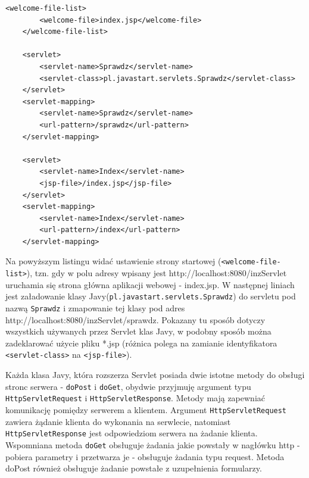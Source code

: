 \documentclass[eng,printmode,oneside]{mgr}
\begin{document}
\lstset{language=XML,firstnumber=1,stepnumber=1}
\begin{lstlisting}[caption=Fragment pliku web.xml,label=webxml]
	<welcome-file-list>
		<welcome-file>index.jsp</welcome-file>
	</welcome-file-list>

	<servlet>
		<servlet-name>Sprawdz</servlet-name>
		<servlet-class>pl.javastart.servlets.Sprawdz</servlet-class>
	</servlet>
	<servlet-mapping>
		<servlet-name>Sprawdz</servlet-name>
		<url-pattern>/sprawdz</url-pattern>
	</servlet-mapping>
	
	<servlet>
		<servlet-name>Index</servlet-name>
		<jsp-file>/index.jsp</jsp-file>
	</servlet>
	<servlet-mapping>
		<servlet-name>Index</servlet-name>
		<url-pattern>/index</url-pattern>
	</servlet-mapping>
\end{lstlisting}

Na powyższym listingu widać ustawienie strony startowej
(\texttt{<welcome-file-list>}), tzn. gdy w polu adresy wpisany jest
http://localhost:8080/inzServlet uruchamia się strona główna aplikacji webowej -
index.jsp. W następnej liniach jest załadowanie klasy
Javy(\texttt{pl.javastart.servlets.Sprawdz}) do servletu pod nazwą
\texttt{Sprawdz} i zmapowanie tej klasy pod adres
http://localhost:8080/inzServlet/sprawdz. Pokazany tu sposób dotyczy wszystkich
używanych przez Servlet klas Javy, w podobny sposób można zadeklarować użycie
pliku *.jsp (różnica polega na zamianie identyfikatora \texttt{<servlet-class>}
na \texttt{<jsp-file>}). 

Każda klasa Javy, która rozszerza Servlet posiada dwie istotne metody do obsługi
stronc serwera - \texttt{doPost} i \texttt{doGet}, obydwie przyjmuję argument
typu \texttt{HttpServletRequest} i \texttt{HttpServletResponse}.
Metody mają zapewniać komunikację pomiędzy serwerem a klientem. Argument
\texttt{HttpServletRequest} zawiera żądanie klienta do wykonania na serwlecie,
natomiast \texttt{HttpServletResponse} jest odpowiedziom serwera na żadanie
klienta.
Wspomniana metoda \texttt{doGet} obsługuje żadania jakie powstały w nagłówku http - pobiera
parametry i przetwarza je - obsługuje żadania typu request. Metoda doPost
również obsługuje żadanie powstałe z uzupełnienia formularzy. 
\end{document}
